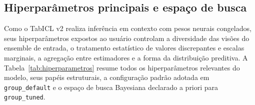 \documentclass[11pt,a4paper]{article}
\begin{document}
\subsection{Hiperparâmetros principais e espaço de busca}
\label{sec:hiperparametros}

Como o TabICL v2 realiza inferência em contexto com pesos neurais congelados, seus hiperparâmetros expostos ao usuário controlam a diversidade das visões do ensemble de entrada, o tratamento estatístico de valores discrepantes e escalas marginais, a agregação entre estimadores e a forma da distribuição preditiva. A Tabela~\ref{tab:hiperparametros} resume todos os hiperparâmetros relevantes do modelo, seus papéis estruturais, a configuração padrão adotada em \texttt{group\_default} e o espaço de busca Bayesiana declarado a priori para \texttt{group\_tuned}.
\end{document}
